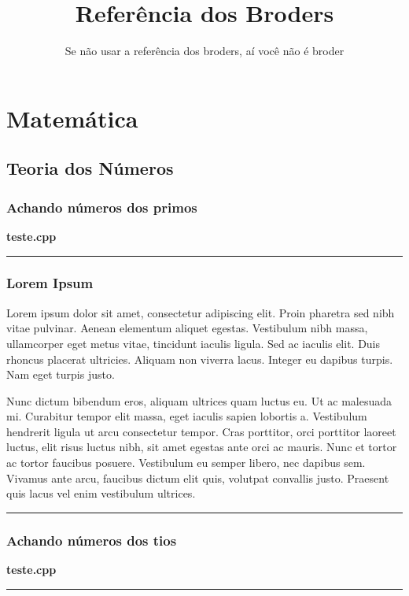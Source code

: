 \documentclass[a4paper,oneside,twocolumn]{article}
\title{Refer\^{e}ncia dos Broders}
\author{Se n\~{a}o usar a refer\^{e}ncia dos broders, a\'{i} voc\^{e} não \'{e} broder}
\newcommand{\Cpp}[1]{\begin{center}\small\textbf{#1.cpp}\end{center}}
\newcommand{\divisor}{\begin{center}\rule{375pt}{0.25pt}\end{center}}
\begin{document}
\thispagestyle{fancy}

\maketitle

\tableofcontents

\clearpage


\section{Matemática}

\subsection{Teoria dos Números}


\subsubsection{Achando números dos primos}
\Cpp{teste}
\divisor



\subsubsection{Lorem Ipsum}
Lorem ipsum dolor sit amet, consectetur adipiscing elit. Proin pharetra sed nibh vitae pulvinar. Aenean elementum aliquet egestas. Vestibulum nibh massa, ullamcorper eget metus vitae, tincidunt iaculis ligula. Sed ac iaculis elit. Duis rhoncus placerat ultricies. Aliquam non viverra lacus. Integer eu dapibus turpis. Nam eget turpis justo.

Nunc dictum bibendum eros, aliquam ultrices quam luctus eu. Ut ac malesuada mi. Curabitur tempor elit massa, eget iaculis sapien lobortis a. Vestibulum hendrerit ligula ut arcu consectetur tempor. Cras porttitor, orci porttitor laoreet luctus, elit risus luctus nibh, sit amet egestas ante orci ac mauris. Nunc et tortor ac tortor faucibus posuere. Vestibulum eu semper libero, nec dapibus sem. Vivamus ante arcu, faucibus dictum elit quis, volutpat convallis justo. Praesent quis lacus vel enim vestibulum ultrices.
\divisor



\subsubsection{Achando números dos tios}
\Cpp{teste}
\divisor
\end{document}

